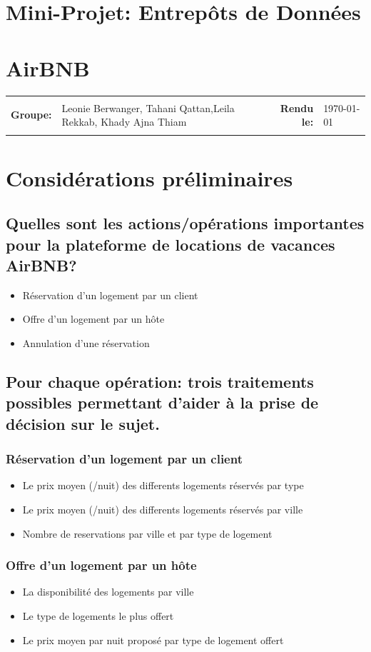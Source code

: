\documentclass[11pt]{article}
\newcommand{\metaInfo}[4]{
	\begin{tabularx}{\textwidth}{rXrl}
	\hline \\
	\textbf{Groupe:}	& #1 &  \textbf{Rendu le:}   & #2 \\
	\\ \hline
	\end{tabularx}
}
\newcommand{\heading}[2]{
	\begin{center}
	\section*{#1}
	\section*{#2}
	\end{center}
}
\begin{document}
\heading{Mini-Projet: Entrepôts de Données}{AirBNB}
\metaInfo{Leonie Berwanger, Tahani Qattan,\newline Leila Rekkab, Khady Ajna Thiam}{\today}

\section{}
\section{Considérations préliminaires}
\subsection{Quelles sont les actions/opérations importantes pour la plateforme de locations de vacances AirBNB?}
\begin{itemize}
	\item Réservation d'un logement par un client
	\item Offre d'un logement par un hôte
	\item Annulation d'une réservation
\end{itemize}
\subsection{Pour chaque opération: trois traitements possibles permettant d’aider à la prise de décision sur le sujet.}
\subsubsection*{Réservation d'un logement par un client}
\begin{itemize}
	\item Le prix moyen (/nuit) des differents logements réservés par type
	\item Le prix moyen (/nuit) des differents logements réservés par ville
	\item Nombre de reservations par ville et par type de logement
\end{itemize}
\subsubsection*{Offre d'un logement par un hôte}
\begin{itemize}
	\item La disponibilité des logements par ville 
	\item Le type de logements le plus offert 
	\item Le prix moyen par nuit proposé par type de logement offert
\end{itemize}
\end{document}
